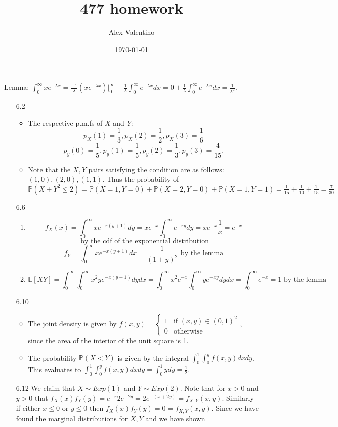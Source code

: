 \documentclass[12pt, letterpaper]{article}
\date{\today}
\author{Alex Valentino}
\title{477 homework}
\newcommand{\E}{\mathbb{E}}
\newcommand{\Pro}{\mathbb{P}}
\begin{document}
Lemma: $\int_0^\infty xe^{-\lambda x} = \frac{-1}{\lambda}(xe^{-\lambda x})|_{0}^\infty + \frac{1}{\lambda} \int_0^\infty e^{-\lambda x}dx = 0 + \frac{1}{\lambda}\int_0^\infty e^{-\lambda x}dx = \frac{1}{\lambda^2}$.
\begin{enumerate}
	\item[6.2] 
	\begin{itemize}
		\item The respective p.m.fs of $X$ and $Y$:
		$$p_X (1) = \frac{1}{3},p_X (2) = \frac{1}{2}, p_X (3) = \frac{1}{6}$$ $$p_y(0) = \frac{1}{5},p_y(1) = \frac{1}{5},p_y(2) = \frac{1}{3},p_y(3) = \frac{4}{15}. $$
		\item Note that the $X,Y$ pairs satisfying the condition are as follows:
		$(1,0),(2,0),(1,1)$.  Thus the probability of $\Pro(X+Y^2 \leq 2) = \Pro(X = 1, Y=0) + \Pro(X=2, Y=0) + \Pro(X=1, Y=1) = \frac{1}{15} + \frac{1}{10} + \frac{1}{15} = \frac{7}{30}$
	\end{itemize}
	\item[6.6] 
	\begin{enumerate}
		\item $$f_X(x) = \int_0^\infty xe^{-x(y+1)} dy = xe^{-x}\int_0^\infty e^{-xy}dy = xe^{-x} \frac{1}{x} = e^{-x} $$
		$$\text{ by the cdf of the exponential distribution}$$
		$$f_Y = \int_0^\infty xe^{-x(y+1)} dx = \frac{1}{(1+y)^2} \text{ by the lemma}$$
		\item  $$\E[XY] = \int_0^\infty \int_0^\infty x^2y e^{-x(y+1)} dy dx = \int_0^\infty x^2 e^{-x} \int_0^\infty ye^{-xy} dy dx =  \int_0^\infty e^{-x}   = 1 \text{ by the lemma}$$
	\end{enumerate}
	\item[6.10] 
	\begin{itemize}
		\item The joint density is given by $f(x,y) = \begin{cases} 1 & \text{if } (x,y) \in (0,1)^2\\
		0 & \text{otherwise} \end{cases}$, since the area of the interior of the unit square is 1.  
		\item The probability $\Pro(X < Y)$ is given by the integral $\int_0^1 \int_0^y f(x,y) dx dy$.  This evaluates to $\int_0^1 \int_0^y f(x,y) dx dy = \int_0^1 y dy = \frac{1}{2}$.  
	\end{itemize}
	\item[6.12] We claim that $X \sim Exp(1)$ and $Y \sim Exp(2)$.  Note that for $x > 0$ and $y>0$ that $f_X(x)f_Y(y) = e^{-x}2e^{-2y} = 2e^{-(x+2y)} = f_{X,Y}(x,y)$.  Similarly if either $x\leq 0$ or $y \leq 0$ then $f_X(x)f_Y(y) = 0 = f_{X,Y}(x,y)$.  Since we have found the marginal distributions for $X,Y$ and we have shown 

\end{enumerate}
\end{document}
